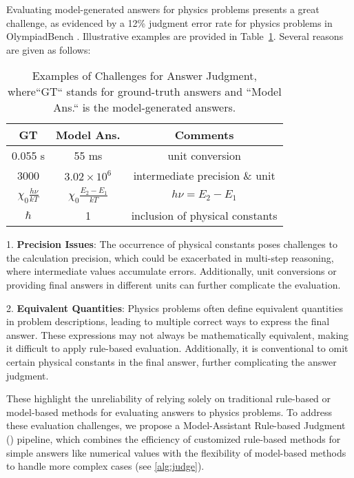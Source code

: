 Evaluating model-generated answers for physics problems presents a great challenge, as evidenced by a 12\% judgment error rate for physics problems in OlympiadBench \citep{OlympiadBench2024He}. 
Illustrative examples are provided in Table~\ref{tab:physcis_judge_example}.
Several reasons are given as follows:

\begin{table}
    \centering
    \footnotesize
    \caption{Examples of Challenges for Answer Judgment, where``GT`` stands for ground-truth answers and ``Model Ans.`` is the model-generated answers.}
    \begin{tabular}{ccc}
    \toprule
         GT & Model Ans. & Comments \\
    \midrule
        0.055 s & 55 ms & unit conversion    \\
        3000 & $3.02 \times 10^6$ & intermediate precision \& unit \\
          $\chi_0 \frac{h\nu}{kT}$ & $\chi_0 \frac{E_2 - E_1}{kT}$ & $h\nu = E_2 - E_1$\\
          $\hbar$ & 1  & inclusion of physical constants \\
    \bottomrule
    \end{tabular}
    \label{tab:physcis_judge_example}
\end{table}


1. \textbf{Precision Issues}: The occurrence of physical constants poses challenges to the calculation precision, which could be exacerbated in multi-step reasoning, where intermediate values accumulate errors. Additionally, unit conversions or providing final answers in different units can further complicate the evaluation.


2. \textbf{Equivalent Quantities}: Physics problems often define equivalent quantities in problem descriptions, leading to multiple correct ways to express the final answer. These expressions may not always be mathematically equivalent, making it difficult to apply rule-based evaluation.
Additionally, it is conventional to omit certain physical constants in the final answer, further complicating the answer judgment.


These highlight the unreliability of relying solely on traditional rule-based or model-based methods for evaluating answers to physics problems. 
To address these evaluation challenges, we propose a Model-Assistant Rule-based Judgment (\judge) pipeline, which combines the efficiency of customized rule-based methods for simple answers like numerical values with the flexibility of model-based methods to handle more complex cases (see \cref{alg:judge}).





